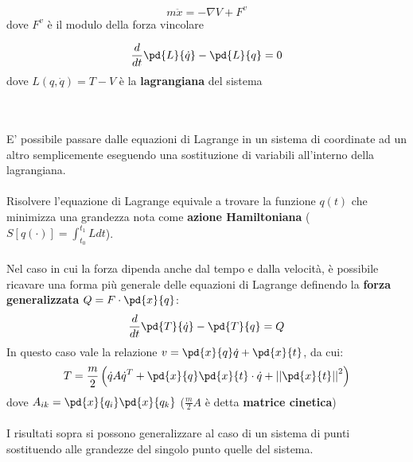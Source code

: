 \documentclass{article}
\begin{document}
\begin{minipage}[c]{.45\columnwidth}
\begin{center}
$$ m\ddot x = -\nabla V + F^{v} $$
\small dove $F^{v}$ è il modulo della forza vincolare
\end{center}
\end{minipage}
\begin{minipage}[c]{.45\columnwidth}
\begin{center}
$$ \frac{d}{dt}\pd{L}{\dot q}-\pd{L}{q}=0 $$
\small dove $L(q,\dot q)=T-V$ è la \textbf{lagrangiana} del sistema
\end{center}
\end{minipage}
\\\\
E' possibile passare dalle equazioni di Lagrange in un sistema di coordinate ad un altro semplicemente eseguendo una sostituzione di variabili all'interno della lagrangiana.\\\\
Risolvere l'equazione di Lagrange equivale a trovare la funzione $q(t)$ che minimizza una grandezza nota come \textbf{azione Hamiltoniana} ($S[q(\cdot)]=\int_{t_0}^{t_1}Ldt$).\\\\
Nel caso in cui la forza dipenda anche dal tempo e dalla velocità, è possibile ricavare una forma più generale delle equazioni di Lagrange definendo la \textbf{forza generalizzata} $Q=F\cdot\pd{x}{q}$:
$$ \frac{d}{dt}\pd{T}{\dot q}-\pd{T}{q}=Q $$
In questo caso vale la relazione $ v=\pd{x}{q}\dot q+\pd{x}{t} $, da cui:
$$ T= \frac{m}{2}\left(\dot q A \dot q^T + \pd{x}{q}\pd{x}{t}\cdot \dot q +\left|\left|\pd{x}{t}\right|\right|^2\right) $$
dove $A_{ik}=\pd{x}{q_i}\pd{x}{q_k}$
\small($\frac{m}{2}A$ è detta \textbf{matrice cinetica})\\\\
I risultati sopra si possono generalizzare al caso di un sistema di punti sostituendo alle grandezze del singolo punto quelle del sistema.\\
\end{document}
